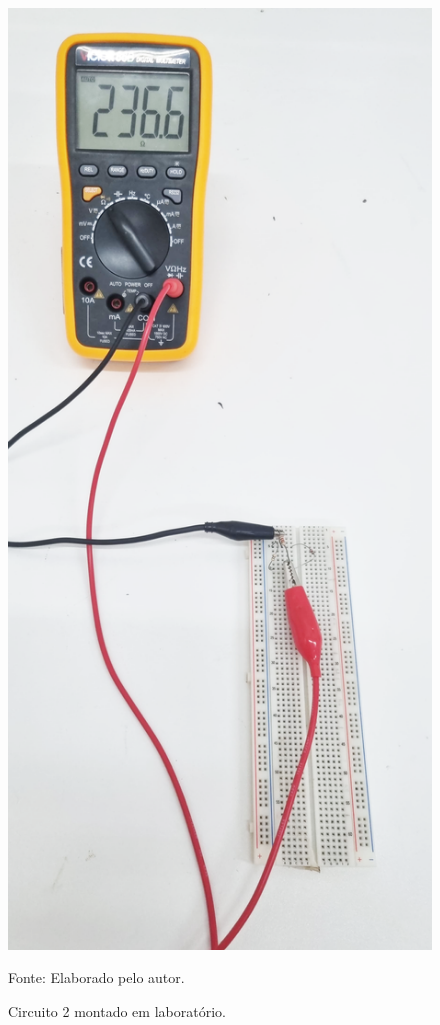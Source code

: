 \documentclass[12pt]{article}
\begin{document}
    \begin{figure}[H]
        \centering
        \caption{Circuito 2 montado em laboratório.}
        \begin{minipage}{0.25\textwidth}
            \centering
            \includegraphics[width=\textwidth]{external-figures/parte2.png}\\
            \raggedright\footnotesize{Fonte: Elaborado pelo autor.}
            \label{fig:pratica2}
        \end{minipage}
    \end{figure}
\end{document}
